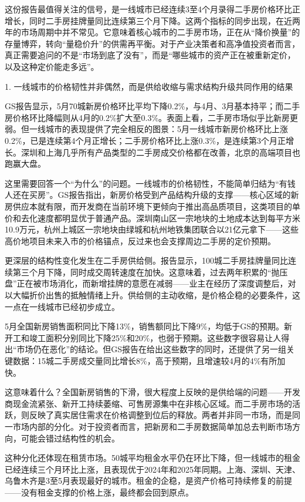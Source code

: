 \documentclass[11pt]{ctexart}
\begin{document}
这份报告最值得关注的信号，是一线城市已经连续3至4个月录得二手房价格环比正增长，同时二手房挂牌量同比连续第三个月下降。这两个指标的同步出现，在近两年的市场周期中并不常见。它意味着核心城市的二手房市场，正在从“降价换量”的存量博弈，转向“量稳价升”的供需再平衡。对于产业决策者和高净值投资者而言，真正需要追问的不是“市场到底了没有”，而是“哪些城市的资产正在被重新定价，以及这种定价能走多远”。

1. 一线城市的价格韧性并非偶然，而是供给收缩与需求结构升级共同作用的结果

GS报告显示，5月70城新房价格环比平均下降0.2\%，与4月、3月基本持平；而二手房价格环比降幅则从4月的0.2\%扩大至0.3\%。表面上看，二手房市场似乎比新房更弱。但一线城市的表现提供了完全相反的图景：5月一线城市新房价格环比上涨0.2\%，已是连续第4个月正增长；二手房价格环比上涨0.3\%，是连续第3个月正增长。深圳和上海几乎所有产品类型的二手房成交价格都在改善，北京的高端项目也跑赢大盘。

这里需要回答一个“为什么”的问题。一线城市的价格韧性，不能简单归结为“有钱人还在买房”。GS报告指出，新房价格受到产品结构升级的支撑——核心区域的新房供应本就有限，而开发商在当前环境下更倾向于推出高品质项目，这类项目的单价和去化速度都明显优于普通产品。深圳南山区一宗地块的土地成本达到每平方米10.9万元，杭州上城区一宗地块由绿城和杭州地铁集团联合以21亿元拿下——这些高价地项目未来入市的价格锚点，反过来也会支撑周边二手房的定价预期。

更深层的结构性变化发生在二手房供给侧。报告显示，100城二手房挂牌量同比连续第三个月下降，同时成交周转速度在加快。这意味着，过去两年积累的“抛压盘”正在被市场消化，而新增挂牌的意愿在减弱——业主在经历了深度调整后，对以大幅折价出售的抵触情绪上升。供给侧的主动收缩，是价格企稳的必要条件，这一点在一线城市已经初步成立。

5月全国新房销售面积同比下降13\%，销售额同比下降9\%，均低于GS的预期。新开工和竣工面积分别同比下降25\%和20\%，也弱于预期。这些数字很容易让人得出“市场仍在恶化”的结论。但GS报告在给出这些数字的同时，还提供了另一组关键数据：15城二手房成交量同比增长8\%，高于预期，且增速较4月的4\%有所加快。

这意味着什么？全国新房销售的下滑，很大程度上反映的是供给端的问题——开发商现金流紧张、新开工持续萎缩、可售房源集中在非核心区域。而二手房市场的活跃，则反映了真实居住需求在价格调整到位后的释放。两者并非同一市场，而是同一市场内部的分化。对于投资者而言，把新房和二手房数据简单加总去判断市场方向，可能会错过结构性的机会。

这种分化还体现在租赁市场。50城平均租金水平仍在环比下降，但一线城市的租金已经连续三个月环比上涨，且表现优于2024年和2025年同期。上海、深圳、天津、乌鲁木齐是3至5月表现最好的城市。租金的企稳，是资产价格可持续修复的前提——没有租金支撑的价格上涨，最终都会回到原点。
\end{document}
